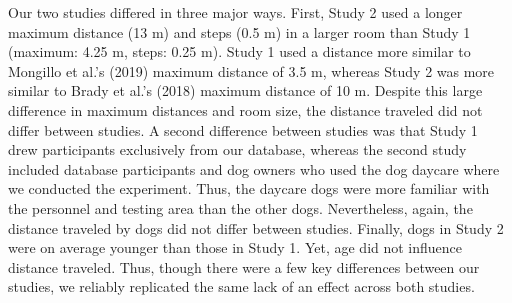 \documentclass[
  pub,floatsintext]{apa6}
\begin{document}
Our two studies differed in three major ways. First, Study 2 used a longer maximum distance (13 m) and steps (0.5 m) in a larger room than Study 1 (maximum: 4.25 m, steps: 0.25 m). Study 1 used a distance more similar to Mongillo et al.'s (2019) maximum distance of 3.5 m, whereas Study 2 was more similar to Brady et al.'s (2018) maximum distance of 10 m. Despite this large difference in maximum distances and room size, the distance traveled did not differ between studies. A second difference between studies was that Study 1 drew participants exclusively from our database, whereas the second study included database participants and dog owners who used the dog daycare where we conducted the experiment. Thus, the daycare dogs were more familiar with the personnel and testing area than the other dogs. Nevertheless, again, the distance traveled by dogs did not differ between studies. Finally, dogs in Study 2 were on average younger than those in Study 1. Yet, age did not influence distance traveled. Thus, though there were a few key differences between our studies, we reliably replicated the same lack of an effect across both studies.
\end{document}
